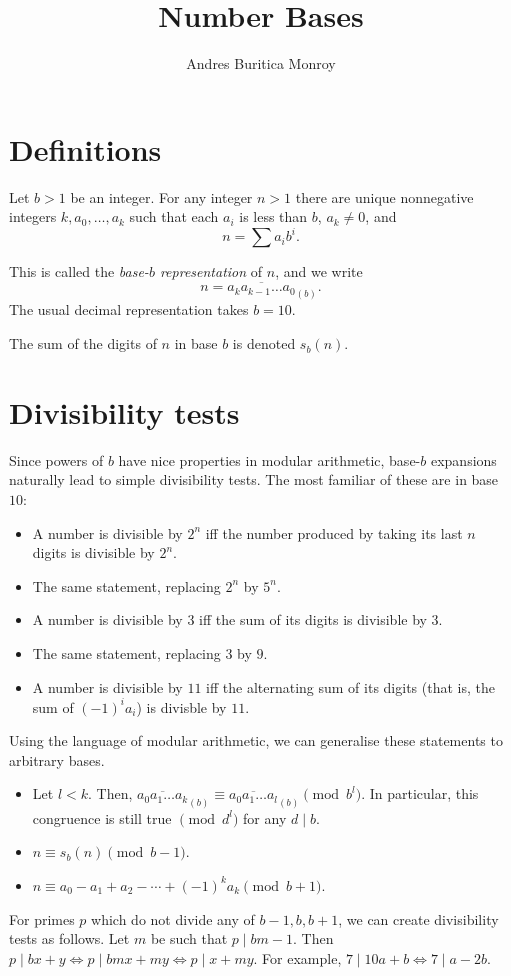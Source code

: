 \documentclass{article}
\title{Number Bases}
\author{Andres Buritica Monroy}
\date{}
\begin{document}
\maketitle
\section{Definitions}
Let $b>1$ be an integer. For any integer $n>1$ there are unique nonnegative
integers $k,a_0,\ldots,a_k$ such that each $a_i$ is less than $b$,
$a_k\ne 0$, and \[n=\sum a_i b^i.\]

This is called the \emph{base-$b$ representation} of $n$, and we write
\[n=\overline{a_k a_{k-1}\ldots a_0}_{(b)}.\]
The usual decimal representation takes $b=10$.

The sum of the digits of $n$ in base $b$ is denoted $s_b(n)$.
\section{Divisibility tests}
Since powers of $b$ have nice properties in modular arithmetic, base-$b$ expansions
naturally lead to simple divisibility tests. The most familiar of these are in
base $10$:
\begin{itemize}
    \item A number is divisible by $2^n$ iff the number produced by taking its
        last $n$ digits is divisible by $2^n$.
    \item The same statement, replacing $2^n$ by $5^n$.
    \item A number is divisible by $3$ iff the sum of its digits is divisible by
        $3$.
    \item The same statement, replacing $3$ by $9$.
    \item A number is divisible by $11$ iff the alternating sum of its digits
        (that is, the sum of $(-1)^i a_i$) is divisble by $11$.
\end{itemize}
Using the language of modular arithmetic, we can generalise these statements to
arbitrary bases.
\begin{itemize}
    \item Let $l<k$. Then,
        $\overline{a_0a_1\ldots a_k}_{(b)}\equiv \overline{a_0a_1\ldots
        a_l}_{(b)}\pmod{b^l}$. In particular, this congruence is still true
        $\pmod{d^l}$ for any $d\mid b$.
    \item $n\equiv s_b(n)\pmod{b-1}$.
    \item $n\equiv a_0-a_1+a_2-\cdots+(-1)^k a_k\pmod{b+1}$.
\end{itemize}
For primes $p$ which do not divide any of $b-1,b,b+1$,
we can create divisibility tests as follows. Let $m$ be
such that $p\mid bm-1$. Then $p\mid bx+y\iff p\mid bmx+my\iff p\mid
x+my$. For example, $7\mid 10a+b\iff 7\mid a-2b$.
\end{document}
